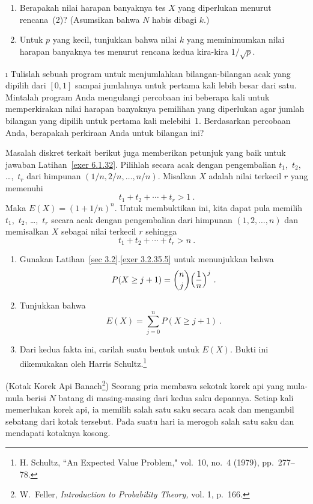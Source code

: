 \begin{LJSItem}
\begin{enumerate}
\item Berapakah nilai harapan banyaknya tes $X$ yang diperlukan menurut
rencana~(2)? (Asumsikan bahwa $N$ habis dibagi $k$.)

\item Untuk $p$ yang kecil, tunjukkan bahwa nilai $k$ yang meminimumkan nilai harapan
banyaknya tes menurut rencana kedua kira-kira $1/\sqrt p$.
\end{enumerate}

\i\label{exer 6.1.32} Tulislah sebuah program untuk menjumlahkan bilangan-bilangan acak yang dipilih dari $[0,1]$
sampai jumlahnya untuk pertama kali lebih besar dari satu. Mintalah program Anda mengulangi
percobaan ini beberapa kali untuk memperkirakan nilai harapan banyaknya pemilihan yang diperlukan
agar jumlah bilangan yang dipilih untuk pertama kali melebihi~1. Berdasarkan
percobaan Anda, berapakah perkiraan Anda untuk bilangan ini?

\istar\label{exer 6.1.33} Masalah diskret terkait berikut juga memberikan petunjuk yang baik
untuk jawaban Latihan~\ref{exer 6.1.32}. Pilihlah secara acak dengan pengembalian
$t_1$,~$t_2$,
\dots,~$t_r$ dari himpunan $(1/n, 2/n, \dots, n/n)$. Misalkan $X$ adalah nilai terkecil
$r$ yang memenuhi
$$ t_1 + t_2 +\cdots+ t_r > 1\ .
$$ Maka $E(X) = (1 + 1/n)^n$. Untuk membuktikan ini, kita dapat pula memilih
$t_1$,~$t_2$, \dots,~$t_r$ secara acak dengan pengembalian dari himpunan $(1, 2,
\dots, n)$ dan memisalkan $X$ sebagai nilai terkecil $r$ sehingga
$$ t_1 + t_2 +\cdots+ t_r > n\ .
$$
\begin{enumerate}
\item Gunakan Latihan~\ref{sec 3.2}.\ref{exer 3.2.35.5} untuk menunjukkan bahwa
$$ P(X \geq j + 1) = {n \choose j}{\Bigl(\frac {1}{n}\Bigr)^j}\ .
$$
\item Tunjukkan bahwa
$$ E(X) = \sum_{j = 0}^n P(X \geq j + 1)\ .
$$
\item Dari kedua fakta ini, carilah suatu bentuk untuk $E(X)$. Bukti ini dikemukakan oleh
Harris Schultz.\footnote{H. Schultz, ``An Expected Value Problem,"  vol.~10, no.~4 (1979), pp.~277--78.}
\end{enumerate}

\istar\label{exer 6.1.34} (Kotak Korek Api Banach\footnote{W.~Feller, {\em
Introduction to Probability Theory,} vol. 1, p.~166.}) Seorang pria membawa sekotak korek api yang mula-mula berisi $N$ batang di masing-masing dari kedua
saku depannya. Setiap kali memerlukan korek api, ia memilih
salah satu saku secara acak dan mengambil sebatang dari kotak tersebut. Pada suatu hari ia merogoh salah satu saku
dan mendapati kotaknya kosong.


\end{LJSItem}
